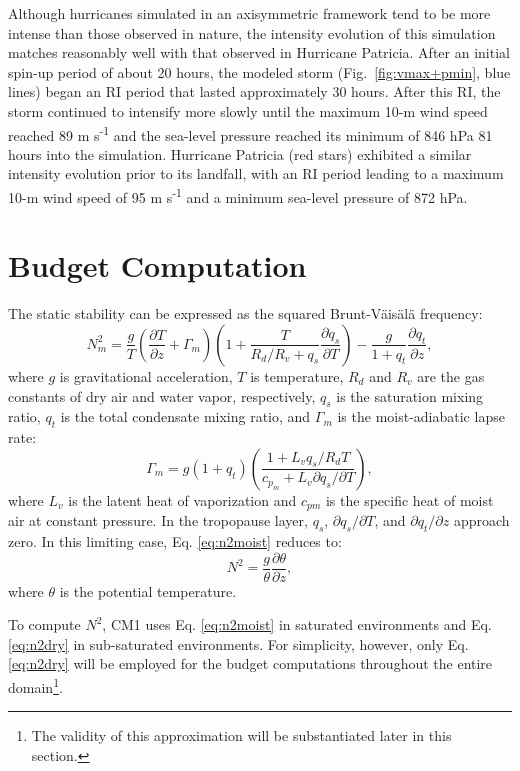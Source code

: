 \documentclass{ametsoc}
\begin{document}
Although hurricanes simulated in an axisymmetric framework tend to be more intense than those observed in nature, the intensity evolution of this simulation matches reasonably well with that observed in Hurricane Patricia.
After an initial spin-up period of about 20 hours, the modeled storm (Fig.~\ref{fig:vmax+pmin}, blue lines) began an RI period that lasted approximately 30 hours.
After this RI, the storm continued to intensify more slowly until the maximum 10-m wind speed reached 89 m s\textsuperscript{-1} and the sea-level pressure reached its minimum of 846 hPa 81 hours into the simulation.
Hurricane Patricia (red stars) exhibited a similar intensity evolution prior to its landfall, with an RI period leading to a maximum 10-m wind speed of 95 m s\textsuperscript{-1} and a minimum sea-level pressure of 872 hPa.

 \section{Budget Computation}

The static stability can be expressed as the squared Brunt-V{\"a}is{\"a}l{\"a} frequency:
   \begin{equation} \label{eq:n2moist}
   N_m^2 = \frac{g}{T}\left(\frac{\partial T}{\partial z}+\Gamma_m\right)\left(1+\frac{T}{R_d/R_v+q_s}\frac{\partial q_s}{\partial T}\right)-\frac{g}{1+q_t}\frac{\partial q_t}{\partial z},
   \end{equation}
where $g$ is gravitational acceleration, $T$ is temperature, $R_d$ and $R_v$ are the gas constants of dry air and water vapor, respectively, $q_s$ is the saturation mixing ratio, $q_t$ is the total condensate mixing ratio, and $\Gamma_m$ is the moist-adiabatic lapse rate:
   \begin{equation} \label{eq:gamma_m}
   \Gamma_m = g(1+q_t)\left(\frac{1+L_vq_s/R_dT}{c_p_m +L_v\partial q_s/\partial T}\right),
   \end {equation}
where $L_v$ is the latent heat of vaporization and $c_{pm}$ is the specific heat of moist air at constant pressure.
In the tropopause layer, $q_s$, ${\partial q_s}/{\partial T}$, and ${\partial q_t}/{\partial z}$ approach zero. In this limiting case, Eq. \ref{eq:n2moist} reduces to:
   \begin{equation} \label{eq:n2dry}
   N^2 = \frac{g}{\theta}\frac{\partial \theta}{\partial z},
   \end{equation}
where $\theta$ is the potential temperature.

To compute $N^2$, CM1 uses Eq. \ref{eq:n2moist} in saturated environments and Eq. \ref{eq:n2dry} in sub-saturated environments. For simplicity, however, only Eq. \ref{eq:n2dry} will be employed for the budget computations throughout the entire domain\footnote{The validity of this approximation will be substantiated later in this section.}.
\end{document}
